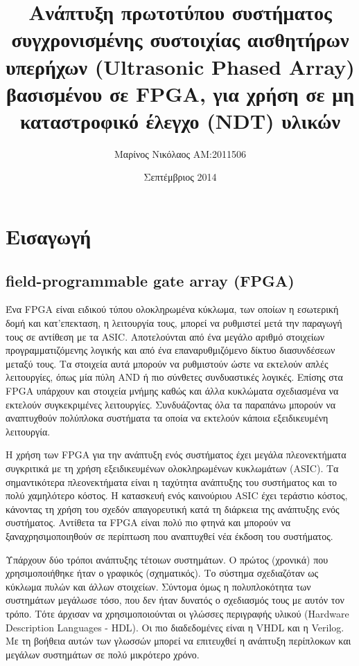 \documentclass[12pt,a4paper]{book}
\title{Ανάπτυξη πρωτοτύπου συστήματος συγχρονισμένης συστοιχίας αισθητήρων υπερήχων (Ultrasonic Phased Array) βασισμένου σε FPGA, για χρήση σε μη καταστροφικό έλεγχο (NDT) υλικών}
\author{Μαρίνος Νικόλαος ΑΜ:2011506}
\date{Σεπτέμβριος 2014}
\begin{document}
{\Huge \maketitle}
\tableofcontents

\chapter{Εισαγωγή}
\section{field-programmable gate array (FPGA)}
Ένα FPGA είναι ειδικού τύπου ολοκληρωμένα κύκλωμα, των οποίων η εσωτερική δομή και κατ'επεκταση, η λειτουργία τους, μπορεί να ρυθμιστεί μετά την παραγωγή τους σε αντίθεση με τα ASIC. Αποτελούνται από ένα μεγάλο αριθμό στοιχείων προγραμματιζόμενης λογικής και από ένα επαναρυθμιζόμενο δίκτυο διασυνδέσεων μεταξύ τους. Τα στοιχεία αυτά μπορούν να ρυθμιστούν ώστε να εκτελούν απλές λειτουργίες, όπως μία πύλη AND ή πιο σύνθετες συνδυαστικές λογικές. Επίσης στα FPGA υπάρχουν και στοιχεία μνήμης καθώς και άλλα κυκλώματα σχεδιασμένα να εκτελούν συγκεκριμένες λειτουργίες. Συνδυάζοντας όλα τα παραπάνω μπορούν να αναπτυχθούν πολύπλοκα συστήματα τα οποία να εκτελούν κάποια εξειδικευμένη λειτουργία.

Η χρήση των FPGA για την ανάπτυξη ενός συστήματος έχει μεγάλα πλεονεκτήματα συγκριτικά με τη χρήση εξειδικευμένων ολοκληρωμένων κυκλωμάτων (ASIC). Τα σημαντικότερα πλεονεκτήματα είναι η ταχύτητα ανάπτυξης του συστήματος και το πολύ χαμηλότερο κόστος. Η κατασκευή ενός καινούριου ASIC έχει τεράστιο κόστος, κάνοντας τη χρήση του σχεδόν απαγορευτική κατά τη διάρκεια της ανάπτυξης ενός συστήματος. Αντίθετα τα FPGA είναι πολύ πιο φτηνά και μπορούν να ξαναχρησιμοποιηθούν σε περίπτωση που αναπτυχθεί νέα έκδοση του συστήματος.

Υπάρχουν δύο τρόποι ανάπτυξης τέτοιων συστημάτων. Ο πρώτος (χρονικά) που χρησιμοποιήθηκε ήταν ο γραφικός (σχηματικός). Το σύστημα σχεδιαζόταν ως κύκλωμα πυλών και άλλων στοιχείων. Σύντομα όμως η πολυπλοκότητα των συστημάτων μεγάλωσε τόσο, που δεν ήταν δυνατός ο σχεδιασμός τους με αυτόν τον τρόπο. Τότε άρχισαν να χρησιμοποιούνται οι γλώσσες περιγραφής υλικού (Hardware Description Languages - HDL). Οι πιο διαδεδομένες είναι η VHDL και η Verilog. Με τη βοήθεια αυτών των γλωσσών μπορεί να επιτευχθεί η ανάπτυξη περίπλοκων και μεγάλων συστημάτων σε πολύ μικρότερο χρόνο.
\end{document}
